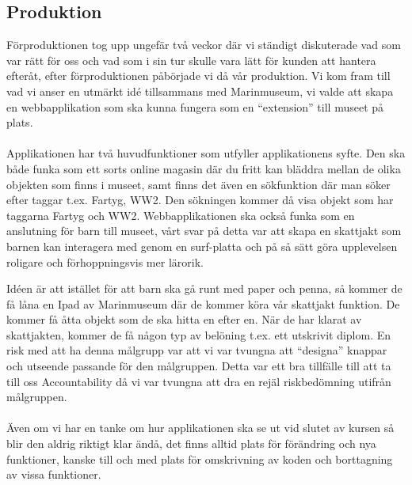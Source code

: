 \documentclass[12pt, titlepage]{article}
\begin{document}
\subsection{Produktion}
Förproduktionen tog upp ungefär två veckor där vi ständigt diskuterade vad som var rätt för oss och vad som i 
sin tur skulle vara lätt för kunden att hantera efteråt, efter förproduktionen påbörjade vi då vår produktion. 
Vi kom fram till vad vi anser en utmärkt idé tillsammans med Marinmuseum, vi valde att skapa en webbapplikation 
som ska kunna fungera som en “extension” till museet på plats. 
\\
\\
Applikationen har två huvudfunktioner som utfyller applikationens syfte. Den ska både funka som ett sorts 
online magasin där du fritt kan bläddra mellan de olika objekten som finns i museet, samt finns det 
även en sökfunktion där man söker efter taggar t.ex. Fartyg, WW2. 
Den sökningen kommer då visa objekt som har taggarna Fartyg och WW2. 
Webbapplikationen ska också funka som en anslutning för barn till museet, vårt svar på detta 
var att skapa en skattjakt som barnen kan interagera med genom en surf-platta och på så sätt göra 
upplevelsen roligare och förhoppningsvis mer lärorik. 

Idéen är att istället för att barn ska 
gå runt med paper och penna, så kommer de få låna en Ipad av Marinmuseum där de kommer köra 
vår skattjakt funktion. De kommer få åtta objekt som de ska hitta en efter en. 
När de har klarat av skattjakten, kommer de få någon typ av belöning t.ex. ett utskrivit diplom. 
En risk med att ha denna målgrupp var att vi var tvungna att “designa” knappar och utseende passande 
för den målgruppen. Detta var ett bra tillfälle till att ta till oss Accountability då vi var tvungna att 
dra en rejäl riskbedömning utifrån målgruppen. 
\\
\\
Även om vi har en tanke om hur applikationen ska se ut vid slutet av kursen så blir den 
aldrig riktigt klar ändå, det finns alltid plats för förändring och nya funktioner, 
kanske till och med plats för omskrivning av koden och borttagning av vissa funktioner. 
\end{document}
